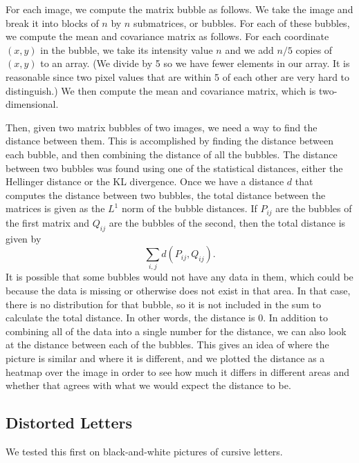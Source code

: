 \documentclass{article}
\begin{document}
For each image, we compute the matrix bubble as follows. We take the image and break it into blocks of $n$ by $n$ submatrices, or bubbles. For each of these bubbles, we compute the mean and covariance matrix as follows. For each coordinate $(x, y)$ in the bubble, we take its intensity value $n$ and we add $n/5$ copies of $(x, y)$ to an array. (We divide by 5 so we have fewer elements in our array. It is reasonable since two pixel values that are within 5 of each other are very hard to distinguish.) We then compute the mean and covariance matrix, which is two-dimensional.

Then, given two matrix bubbles of two images, we need a way to find the distance between them. This is accomplished by finding the distance between each bubble, and then combining the distance of all the bubbles. The distance between two bubbles was found using one of the statistical distances, either the Hellinger distance or the KL divergence. Once we have a distance $d$ that computes the distance between two bubbles, the total distance between the matrices is given as the $L^1$ norm of the bubble distances. If $P_{ij}$ are the bubbles of the first matrix and $Q_{ij}$ are the bubbles of the second, then the total distance is given by
\[
    \sum_{i,j} d(P_{ij},Q_{ij}).
\]
It is possible that some bubbles would not have any data in them, which could be because the data is missing or otherwise does not exist in that area. In that case, there is no distribution for that bubble, so it is not included in the sum to calculate the total distance. In other words, the distance is 0. In addition to combining all of the data into a single number for the distance, we can also look at the distance between each of the bubbles. This gives an idea of where the picture is similar and where it is different, and we plotted the distance as a heatmap over the image in order to see how much it differs in different areas and whether that agrees with what we would expect the distance to be.

\subsection{Distorted Letters}

We tested this first on black-and-white pictures of cursive letters.\cite{alphabetsprintables}
\end{document}
